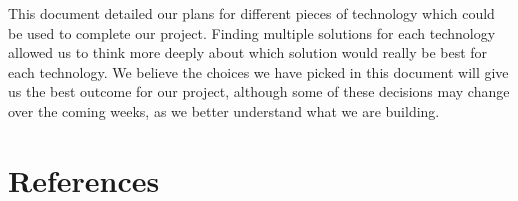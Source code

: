 \documentclass[10pt,letterpaper,onecolumn,journal]{IEEEtran}
\begin{document}
This document detailed our plans for different pieces of technology which could be used to complete our project. Finding multiple solutions for each technology allowed us to think more deeply about which solution would really be best for each technology. We believe the choices we have picked in this document will give us the best outcome for our project, although some of these decisions may change over the coming weeks, as we better understand what we are building.

\section{References}



\end{document}
